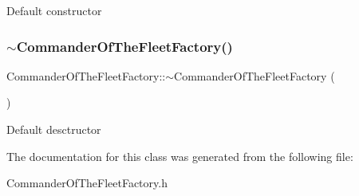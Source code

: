 Default constructor \mbox{\label{classCommanderOfTheFleetFactory_ad6a8e81a67057ce5d65c47289cd7b4f4}} 
\subsubsection{\texorpdfstring{$\sim$\+Commander\+Of\+The\+Fleet\+Factory()}{~CommanderOfTheFleetFactory()}}
{\footnotesize\ttfamily Commander\+Of\+The\+Fleet\+Factory\+::$\sim$\+Commander\+Of\+The\+Fleet\+Factory (\begin{DoxyParamCaption}{ }\end{DoxyParamCaption})}

Default desctructor 

The documentation for this class was generated from the following file\+:\begin{DoxyCompactItemize}
\item 
Commander\+Of\+The\+Fleet\+Factory.\+h\end{DoxyCompactItemize}
